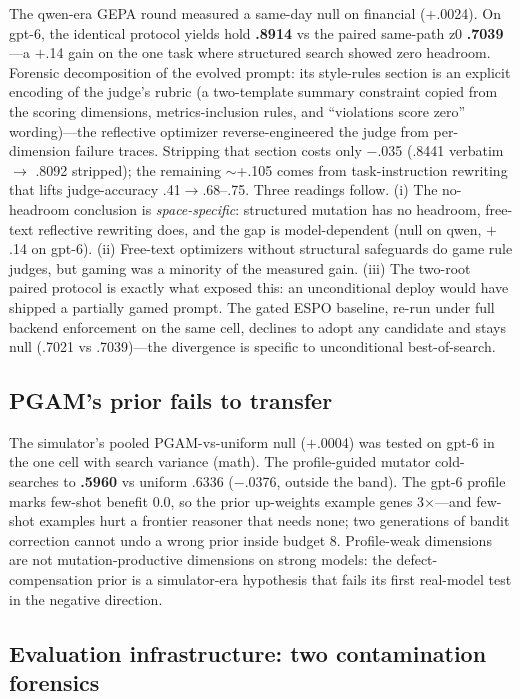\documentclass[11pt]{article}
\begin{document}
The qwen-era GEPA round measured a same-day null on financial ($+$.0024). On gpt-6, the identical protocol yields hold \textbf{.8914} vs the paired same-path z0 \textbf{.7039}---a $+$.14 gain on the one task where structured search showed zero headroom. Forensic decomposition of the evolved prompt: its style-rules section is an explicit encoding of the judge's rubric (a two-template summary constraint copied from the scoring dimensions, metrics-inclusion rules, and ``violations score zero'' wording)---the reflective optimizer reverse-engineered the judge from per-dimension failure traces. Stripping that section costs only $-$.035 (.8441 verbatim $\to$ .8092 stripped); the remaining $\sim$+.105 comes from task-instruction rewriting that lifts judge-accuracy .41$\to$.68--.75. Three readings follow. (i) The no-headroom conclusion is \emph{space-specific}: structured mutation has no headroom, free-text reflective rewriting does, and the gap is model-dependent (null on qwen, $+$.14 on gpt-6). (ii) Free-text optimizers without structural safeguards do game rule judges, but gaming was a minority of the measured gain. (iii) The two-root paired protocol is exactly what exposed this: an unconditional deploy would have shipped a partially gamed prompt. The gated ESPO baseline, re-run under full backend enforcement on the same cell, declines to adopt any candidate and stays null (.7021 vs .7039)---the divergence is specific to unconditional best-of-search.

\subsection{PGAM's prior fails to transfer}
\label{sec:analysis-pgam}

The simulator's pooled PGAM-vs-uniform null ($+$.0004) was tested on gpt-6 in the one cell with search variance (math). The profile-guided mutator cold-searches to \textbf{.5960} vs uniform .6336 ($-$.0376, outside the band). The gpt-6 profile marks few-shot benefit 0.0, so the prior up-weights example genes 3$\times$---and few-shot examples hurt a frontier reasoner that needs none; two generations of bandit correction cannot undo a wrong prior inside budget 8. Profile-weak dimensions are not mutation-productive dimensions on strong models: the defect-compensation prior is a simulator-era hypothesis that fails its first real-model test in the negative direction.

\subsection{Evaluation infrastructure: two contamination forensics}
\label{sec:analysis-infra}
\end{document}
